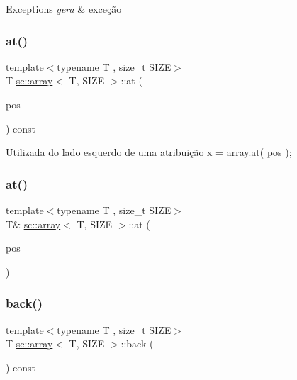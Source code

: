 \begin{DoxyExceptions}{Exceptions}
{\em gera} & exceção \\
\hline
\end{DoxyExceptions}
\mbox{\label{classsc_1_1array_aad40fb7df50600eb5be40fcb566b9087}} 
\subsubsection{\texorpdfstring{at()}{at()}\hspace{0.1cm}{\footnotesize\ttfamily [2/3]}}
{\footnotesize\ttfamily template$<$typename T , size\+\_\+t S\+I\+ZE$>$ \\
T \hyperlink{classsc_1_1array}{sc\+::array}$<$ T, S\+I\+ZE $>$\+::at (\begin{DoxyParamCaption}\item[{size\+\_\+t}]{pos }\end{DoxyParamCaption}) const\hspace{0.3cm}{\ttfamily [inline]}}

Utilizada do lado esquerdo de uma atribuição x = array.\+at( pos ); \mbox{\label{classsc_1_1array_aff94618867791f38760b766579a0668d}} 
\subsubsection{\texorpdfstring{at()}{at()}\hspace{0.1cm}{\footnotesize\ttfamily [3/3]}}
{\footnotesize\ttfamily template$<$typename T , size\+\_\+t S\+I\+ZE$>$ \\
T\& \hyperlink{classsc_1_1array}{sc\+::array}$<$ T, S\+I\+ZE $>$\+::at (\begin{DoxyParamCaption}\item[{size\+\_\+t}]{pos }\end{DoxyParamCaption})\hspace{0.3cm}{\ttfamily [inline]}}

\mbox{\label{classsc_1_1array_afb7bab6d5a69b9b2d47ab1dbf6b108e7}} 
\subsubsection{\texorpdfstring{back()}{back()}}
{\footnotesize\ttfamily template$<$typename T , size\+\_\+t S\+I\+ZE$>$ \\
T \hyperlink{classsc_1_1array}{sc\+::array}$<$ T, S\+I\+ZE $>$\+::back (\begin{DoxyParamCaption}\item[{void}]{ }\end{DoxyParamCaption}) const\hspace{0.3cm}{\ttfamily [inline]}}

